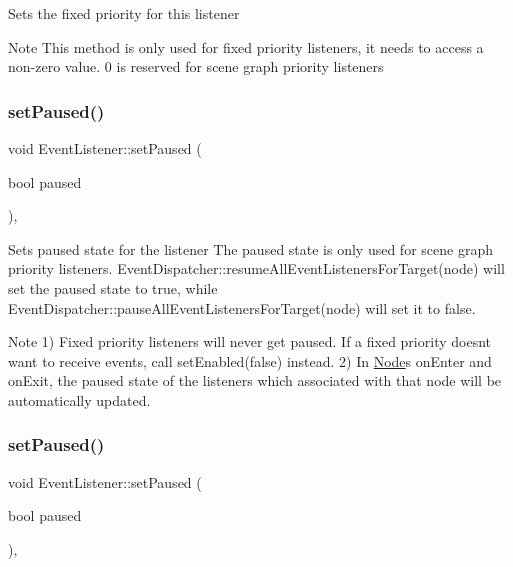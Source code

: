 Sets the fixed priority for this listener \begin{DoxyNote}{Note}
This method is only used for {\ttfamily fixed priority listeners}, it needs to access a non-\/zero value. 0 is reserved for scene graph priority listeners 
\end{DoxyNote}
\mbox{\label{classEventListener_a1897f06fa8bb777f636d3c7396d20a40}} 
\subsubsection{\texorpdfstring{set\+Paused()}{setPaused()}\hspace{0.1cm}{\footnotesize\ttfamily [1/2]}}
{\footnotesize\ttfamily void Event\+Listener\+::set\+Paused (\begin{DoxyParamCaption}\item[{bool}]{paused }\end{DoxyParamCaption})\hspace{0.3cm}{\ttfamily [inline]}, {\ttfamily [protected]}}

Sets paused state for the listener The paused state is only used for scene graph priority listeners. {\ttfamily Event\+Dispatcher\+::resume\+All\+Event\+Listeners\+For\+Target(node)} will set the paused state to {\ttfamily true}, while {\ttfamily Event\+Dispatcher\+::pause\+All\+Event\+Listeners\+For\+Target(node)} will set it to {\ttfamily false}. \begin{DoxyNote}{Note}
1) Fixed priority listeners will never get paused. If a fixed priority doesn\textquotesingle{}t want to receive events, call {\ttfamily set\+Enabled(false)} instead. 2) In {\ttfamily \hyperlink{classNode}{Node}}\textquotesingle{}s on\+Enter and on\+Exit, the {\ttfamily paused state} of the listeners which associated with that node will be automatically updated. 
\end{DoxyNote}
\mbox{\label{classEventListener_a1897f06fa8bb777f636d3c7396d20a40}} 
\subsubsection{\texorpdfstring{set\+Paused()}{setPaused()}\hspace{0.1cm}{\footnotesize\ttfamily [2/2]}}
{\footnotesize\ttfamily void Event\+Listener\+::set\+Paused (\begin{DoxyParamCaption}\item[{bool}]{paused }\end{DoxyParamCaption})\hspace{0.3cm}{\ttfamily [inline]}, {\ttfamily [protected]}}


